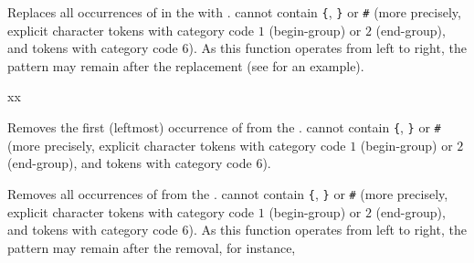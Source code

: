 \documentclass[oneside]{book}
\begin{document}
\begin{function}{\TlVarReplaceAll}
\begin{syntax}
   
\end{syntax}
Replaces all occurrences of  in the
 with . 
cannot contain \verb|{|, \verb|}| or \verb|#|
(more precisely, explicit character tokens with category code $1$
(begin-group) or $2$ (end-group), and tokens with category code $6$).
As this function
operates from left to right, the pattern 
may remain after the replacement (see  for an example).
\begin{demohigh}
\TlSet {}
\TlVarReplaceAll {} {xx}
\TlUse \lTmpaTl
\end{demohigh}
\end{function}

\begin{function}{\TlVarRemoveOnce}
\begin{syntax}
  
\end{syntax}
Removes the first (leftmost) occurrence of  from the
.  cannot contain \verb|{|, \verb|}| or \verb|#|
(more precisely, explicit character tokens with category code $1$
(begin-group) or $2$ (end-group), and tokens with category code $6$).
\begin{demohigh}
\TlSet {}
\TlVarRemoveOnce {}
\TlUse \lTmpaTl
\end{demohigh}
\end{function}

\begin{function}{\TlVarRemoveAll}
\begin{syntax}
  
\end{syntax}
Removes all occurrences of  from the
.  cannot contain \verb|{|, \verb|}| or \verb|#|
(more precisely, explicit character tokens with category code $1$
(begin-group) or $2$ (end-group), and tokens with category code $6$).
As this function
operates from left to right, the pattern 
may remain after the removal, for instance,
\begin{demohigh}
\TlSet {}
\TlVarRemoveAll {}
\TlUse \lTmpaTl
\end{demohigh}
\end{function}
\end{document}
